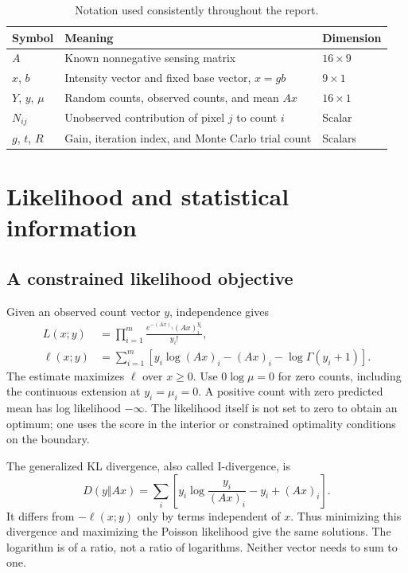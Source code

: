 \documentclass[11pt,a4paper]{article}
\newcommand{\sectionpage}[2]{\clearpage\section{#1}\label{#2}}
\begin{document}
\begin{table}[H]\small
\caption{Notation used consistently throughout the report.}
\begin{tabularx}{\linewidth}{@{}lXl@{}}\toprule
Symbol & Meaning & Dimension\\\midrule
$A$ & Known nonnegative sensing matrix & $16\times9$\\
$x$, $b$ & Intensity vector and fixed base vector, $x=gb$ & $9\times1$\\
$Y$, $y$, $\mu$ & Random counts, observed counts, and mean $Ax$ & $16\times1$\\
$N_{ij}$ & Unobserved contribution of pixel $j$ to count $i$ & Scalar\\
$g$, $t$, $R$ & Gain, iteration index, and Monte Carlo trial count & Scalars\\\bottomrule
\end{tabularx}
\end{table}

\sectionpage{Likelihood and statistical information}{sec:likelihood}
\subsection*{A constrained likelihood objective}
Given an observed count vector $y$, independence gives
\begin{align}
 L(x;y)&=\prod_{i=1}^m\frac{e^{-(Ax)_i}(Ax)_i^{y_i}}{y_i!},\\
 \ell(x;y)&=\sum_{i=1}^m\left[y_i\log(Ax)_i-(Ax)_i-\log\Gamma(y_i+1)\right].
 \label{eq:loglike}
\end{align}
The estimate maximizes $\ell$ over $x\geq0$. Use $0\log\mu=0$ for zero counts, including the continuous extension at $y_i=\mu_i=0$. A positive count with zero predicted mean has log likelihood $-\infty$. The likelihood itself is not set to zero to obtain an optimum; one uses the score in the interior or constrained optimality conditions on the boundary.

The generalized KL divergence, also called I-divergence, is
\begin{equation}
 D(y\Vert Ax)=\sum_i\left[y_i\log\frac{y_i}{(Ax)_i}-y_i+(Ax)_i\right].
\end{equation}
It differs from $-\ell(x;y)$ only by terms independent of $x$. Thus minimizing this divergence and maximizing the Poisson likelihood give the same solutions. The logarithm is of a ratio, not a ratio of logarithms. Neither vector needs to sum to one.
\end{document}
